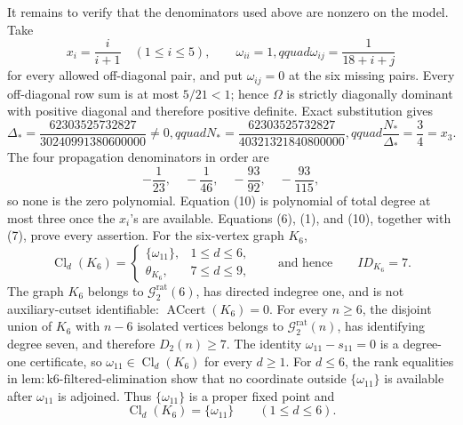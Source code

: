 It remains to verify that the denominators used above are nonzero on the model.  Take
\[
 x_i=\frac{i}{i+1}\quad(1\leq i\leq5),\qquad
 \omega_{ii}=1,qquad
 \omega_{ij}=\frac1{18+i+j}
\]
for every allowed off-diagonal pair, and put \(\omega_{ij}=0\) at the six missing pairs.  Every off-diagonal row sum is at most \(5/21<1\); hence \(\Omega\) is strictly diagonally dominant with positive diagonal and therefore positive definite.  Exact substitution gives
\[
 \Delta_{\!*}=\frac{62303525732827}{30240991380600000}\ne0,qquad
 N_{\!*}=\frac{62303525732827}{40321321840800000},qquad
 \frac{N_{\!*}}{\Delta_{\!*}}=\frac34=x_3. \tag{11}
\]
The four propagation denominators in order are
\[
 -\frac1{23},\quad-\frac1{46},\quad-\frac{93}{92},\quad-\frac{93}{115}, \tag{12}
\]
so none is the zero polynomial.  Equation (10) is polynomial of total degree at most three once the \(x_i\)'s are available.  Equations (6), (1), and (10), together with (7), prove every assertion.
For the six-vertex graph \(K_6\),
\[
 \operatorname{Cl}_d(K_6)=
 \begin{cases}
 \{\omega_{11}\},&1\leq d\leq6,\\
 \theta_{K_6},&7\leq d\leq9,
 \end{cases}
 \qquad\text{and hence}\qquad ID_{K_6}=7.
\]
The graph \(K_6\) belongs to \(\mathcal G_{2}^{\mathrm{rat}}(6)\), has directed indegree one, and is not auxiliary-cutset identifiable: \(\operatorname{ACcert}(K_6)=0\).  For every \(n\geq6\), the disjoint union of \(K_6\) with \(n-6\) isolated vertices belongs to \(\mathcal G_{2}^{\mathrm{rat}}(n)\), has identifying degree seven, and therefore \(D_2(n)\geq7\).
The identity \(\omega_{11}-s_{11}=0\) is a degree-one certificate, so \(\omega_{11}\in\operatorname{Cl}_d(K_6)\) for every \(d\geq1\).  For \(d\leq6\), the rank equalities in \(\mathrm{lem:k6\mbox{-}filtered\mbox{-}elimination}\) show that no coordinate outside \(\{\omega_{11}\}\) is available after \(\omega_{11}\) is adjoined.  Thus \(\{\omega_{11}\}\) is a proper fixed point and
\[
 \operatorname{Cl}_d(K_6)=\{\omega_{11}\}\qquad(1\leq d\leq6). \tag{13}
\]

